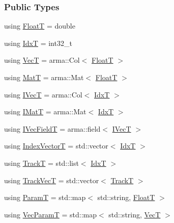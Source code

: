 \subsubsection*{Public Types}
\begin{DoxyCompactItemize}
\item 
using \hyperlink{classtracker_1_1Tracker_a66e8a81f12871e23082264c964f8f103}{FloatT} = double
\item 
using \hyperlink{classtracker_1_1Tracker_ad39a875dc6957cb6a9f3affcf6517d80}{IdxT} = int32\+\_\+t
\item 
using \hyperlink{classtracker_1_1Tracker_a9905fa9b81b252716e651d87d7d57aff}{VecT} = arma\+::\+Col$<$ \hyperlink{classtracker_1_1Tracker_a66e8a81f12871e23082264c964f8f103}{FloatT} $>$
\item 
using \hyperlink{classtracker_1_1Tracker_a60a1d6ee07284ba82f0533c79311ccfd}{MatT} = arma\+::\+Mat$<$ \hyperlink{classtracker_1_1Tracker_a66e8a81f12871e23082264c964f8f103}{FloatT} $>$
\item 
using \hyperlink{classtracker_1_1Tracker_a59a6e01be987f9c0093a8ac5ad97ce33}{I\+VecT} = arma\+::\+Col$<$ \hyperlink{classtracker_1_1Tracker_ad39a875dc6957cb6a9f3affcf6517d80}{IdxT} $>$
\item 
using \hyperlink{classtracker_1_1Tracker_a6de023cd3b5466996624c7e1b7e5d551}{I\+MatT} = arma\+::\+Mat$<$ \hyperlink{classtracker_1_1Tracker_ad39a875dc6957cb6a9f3affcf6517d80}{IdxT} $>$
\item 
using \hyperlink{classtracker_1_1Tracker_a122e1d351fcb4444aec9729cf7625322}{I\+Vec\+FieldT} = arma\+::field$<$ \hyperlink{classtracker_1_1Tracker_a59a6e01be987f9c0093a8ac5ad97ce33}{I\+VecT} $>$
\item 
using \hyperlink{classtracker_1_1Tracker_a50ae514521f940c08813b45f53b6ce2d}{Index\+VectorT} = std\+::vector$<$ \hyperlink{classtracker_1_1Tracker_ad39a875dc6957cb6a9f3affcf6517d80}{IdxT} $>$
\item 
using \hyperlink{classtracker_1_1Tracker_ac1b06aee1b9d85fb75cf6a9579eb0e84}{TrackT} = std\+::list$<$ \hyperlink{classtracker_1_1Tracker_ad39a875dc6957cb6a9f3affcf6517d80}{IdxT} $>$
\item 
using \hyperlink{classtracker_1_1Tracker_a25ee8479eb10f1619a8eefd5d310eeb7}{Track\+VecT} = std\+::vector$<$ \hyperlink{classtracker_1_1Tracker_ac1b06aee1b9d85fb75cf6a9579eb0e84}{TrackT} $>$
\item 
using \hyperlink{classtracker_1_1Tracker_a5fd443ec1139ed82910dd16316100db7}{ParamT} = std\+::map$<$ std\+::string, \hyperlink{classtracker_1_1Tracker_a66e8a81f12871e23082264c964f8f103}{FloatT} $>$
\item 
using \hyperlink{classtracker_1_1Tracker_a1a79f7073d8e1a032369dcc8105604ce}{Vec\+ParamT} = std\+::map$<$ std\+::string, \hyperlink{classtracker_1_1Tracker_a9905fa9b81b252716e651d87d7d57aff}{VecT} $>$
\end{DoxyCompactItemize}
